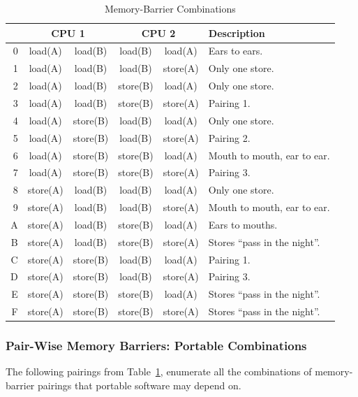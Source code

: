 \begin{table}
\small
\centering
\begin{tabular}{r||c|c||c|c||l}
	\multicolumn{1}{c||}{} & \multicolumn{2}{c||}{CPU 1} &
		\multicolumn{2}{c||}{CPU 2} & Description \\
	\hline
	\hline
	0 & load(A) & load(B) & load(B) & load(A) &
		Ears to ears. \\
	1 & load(A) & load(B) & load(B) & store(A) &
		Only one store. \\
	2 & load(A) & load(B) & store(B) & load(A) &
		Only one store. \\
	3 & load(A) & load(B) & store(B) & store(A) &
		Pairing 1. \\
	\hline
	4 & load(A) & store(B) & load(B) & load(A) &
		Only one store. \\
	5 & load(A) & store(B) & load(B) & store(A) &
		Pairing 2. \\
	6 & load(A) & store(B) & store(B) & load(A) &
		Mouth to mouth, ear to ear. \\
	7 & load(A) & store(B) & store(B) & store(A) &
		Pairing 3. \\
	\hline
	8 & store(A) & load(B) & load(B) & load(A) &
		Only one store. \\
	9 & store(A) & load(B) & load(B) & store(A) &
		Mouth to mouth, ear to ear. \\
	A & store(A) & load(B) & store(B) & load(A) &
		Ears to mouths. \\
	B & store(A) & load(B) & store(B) & store(A) &
		Stores ``pass in the night''. \\
	\hline
	C & store(A) & store(B) & load(B) & load(A) &
		Pairing 1. \\
	D & store(A) & store(B) & load(B) & store(A) &
		Pairing 3. \\
	E & store(A) & store(B) & store(B) & load(A) &
		Stores ``pass in the night''. \\
	F & store(A) & store(B) & store(B) & store(A) &
		Stores ``pass in the night''. \\
\end{tabular}
\caption{Memory-Barrier Combinations}
\label{tab:advsync:Memory-Barrier Combinations}
\end{table}

\subsubsection{Pair-Wise Memory Barriers: Portable Combinations}

The following pairings from
Table~\ref{tab:advsync:Memory-Barrier Combinations},
enumerate all the combinations of memory-barrier
pairings that portable software may depend on.

